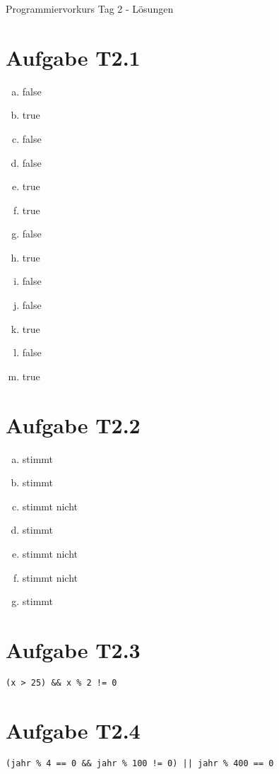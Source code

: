 \documentclass[final,a4paper]{article}
\begin{document}


{\huge Programmiervorkurs Tag 2 - Lösungen}

\bigskip

\section*{Aufgabe T2.1}
\begin{enumerate}[(a)]
	\item false
	\item true
	\item false
	\item false
	\item true
	\item true
	\item false
	\item true
	\item false
	\item false
	\item true
	\item false
	\item true
\end{enumerate}

\section*{Aufgabe T2.2}
\begin{enumerate}[(a)]
	\item stimmt
	\item stimmt
	\item stimmt nicht
	\item stimmt
	\item stimmt nicht
	\item stimmt nicht
	\item stimmt
\end{enumerate}


\section*{Aufgabe T2.3}
\begin{lstlisting}
(x > 25) && x % 2 != 0
\end{lstlisting}

\section*{Aufgabe T2.4}
\begin{lstlisting}
(jahr % 4 == 0 && jahr % 100 != 0) || jahr % 400 == 0
\end{lstlisting}
\end{document}
